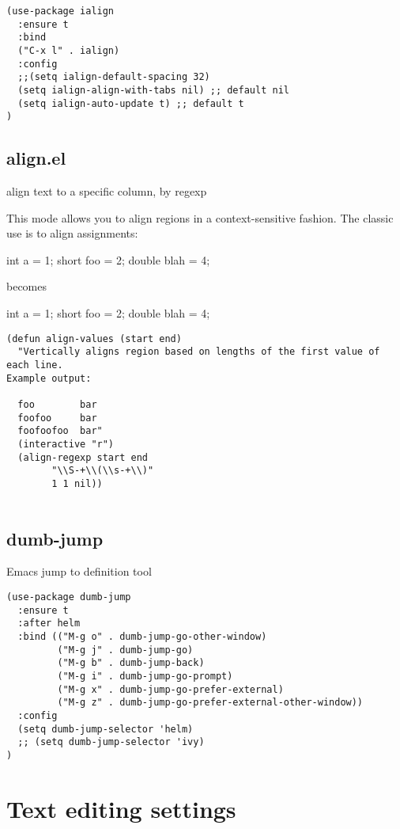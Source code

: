 \documentclass[11pt]{article}
\begin{document}
\begin{verbatim}
(use-package ialign
  :ensure t
  :bind
  ("C-x l" . ialign)
  :config
  ;;(setq ialign-default-spacing 32)
  (setq ialign-align-with-tabs nil) ;; default nil
  (setq ialign-auto-update t) ;; default t
)
\end{verbatim}

\subsection*{align.el}
\label{sec:orgdf7ae41}

align text to a specific column, by regexp

This mode allows you to align regions in a context-sensitive fashion.
The classic use is to align assignments:

int a = 1;
short foo = 2;
double blah = 4;

becomes

int    a    = 1;
short  foo  = 2;
double blah = 4;

\begin{verbatim}
(defun align-values (start end)
  "Vertically aligns region based on lengths of the first value of each line.
Example output:

  foo        bar
  foofoo     bar
  foofoofoo  bar"
  (interactive "r")
  (align-regexp start end
        "\\S-+\\(\\s-+\\)"
        1 1 nil))


\end{verbatim}

\subsection*{dumb-jump}
\label{sec:org370b3f5}
Emacs jump to definition tool

\begin{verbatim}
(use-package dumb-jump
  :ensure t
  :after helm
  :bind (("M-g o" . dumb-jump-go-other-window)
         ("M-g j" . dumb-jump-go)
         ("M-g b" . dumb-jump-back)
         ("M-g i" . dumb-jump-go-prompt)
         ("M-g x" . dumb-jump-go-prefer-external)
         ("M-g z" . dumb-jump-go-prefer-external-other-window))
  :config
  (setq dumb-jump-selector 'helm)
  ;; (setq dumb-jump-selector 'ivy)
)
\end{verbatim}

\section*{Text editing settings}
\label{sec:org34d0ab0}
\end{document}
